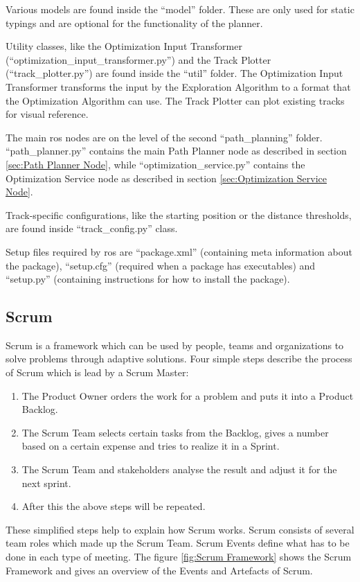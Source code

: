 Various models are found inside the ``model'' folder. These are only used for static typings and are optional for the functionality of the planner.

Utility classes, like the Optimization Input Transformer (``optimization\_input\_transformer.py'') and the Track Plotter (``track\_plotter.py'') are found inside the ``util'' folder. The Optimization Input Transformer transforms the input by the Exploration Algorithm to a format that the Optimization Algorithm can use. The Track Plotter can plot existing tracks for visual reference.

The main \acrshort{ros} nodes are on the level of the second ``path\_planning'' folder. ``path\_planner.py'' contains the main Path Planner node as described in section \ref{sec:Path Planner Node}, while ``optimization\_service.py'' contains the Optimization Service node as described in section \ref{sec:Optimization Service Node}.

Track-specific configurations, like the starting position or the distance thresholds, are found inside ``track\_config.py'' class.

Setup files required by \acrshort{ros} are ``package.xml'' (containing meta information about the package), ``setup.cfg'' (required when a package has executables) and ``setup.py'' (containing instructions for how to install the package).

\subsection{Scrum} \label{sec:Scrum}
Scrum is a framework which can be used by people, teams and organizations to solve problems through adaptive solutions. Four simple steps describe the process of Scrum which is lead by a Scrum Master:
\begin{enumerate}
    \item The Product Owner orders the work for a problem and puts it into a Product Backlog.
    \item The Scrum Team selects certain tasks from the Backlog, gives a number based on a certain expense and tries to realize it in a Sprint.
    \item The Scrum Team and stakeholders analyse the result and adjust it for the next sprint.
    \item After this the above steps will be repeated.
\end{enumerate}

These simplified steps help to explain how Scrum works. Scrum consists of several team roles which made up the Scrum Team. Scrum Events define what has to be done in each type of meeting. The figure \ref{fig:Scrum Framework} shows the Scrum Framework and gives an overview of the Events and Artefacts of Scrum. \cite{scrum_guide}



